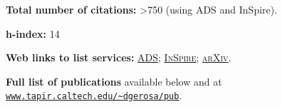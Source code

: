 \documentclass[letterpaper]{moderncv}
\begin{document}
\textbf{Total number of citations:}  {>750}  (using ADS and InSpire).

\textbf{h-index:} 14


\textbf{Web links to list services:}
\href{http://labs.adsabs.harvard.edu/adsabs/search/?q=author%3A%22Gerosa%2C+Davide%22&month_from=&year_from=&month_to=&year_to=&db_f=&nr=&article=1&bigquery=&re_sort_type=CITED&re_sort_dir=desc}{\textsc{ADS}};
\href{http://inspirehep.net/search?ln=en&ln=en&p=exactauthor%3AD.Gerosa.1&of=hb&action_search=Search&sf=&so=d&rm=citation&rg=25&sc=0}{\textsc{InSpire}};
\href{http://arxiv.org/a/gerosa_d_1.html}{\textsc{arXiv}}.

\textbf{Full list of publications} available below and at \href{http://www.tapir.caltech.edu/~dgerosa/pub}{\texttt{www.tapir.caltech.edu/\textasciitilde dgerosa/pub}}.






\vspace{+0.2cm}
\cvitem{\textcolor{color1}{Selected publications}}{}
\vspace{-0.7cm}
\end{document}
